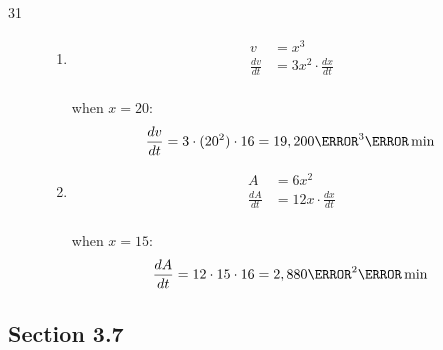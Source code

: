 \documentclass{exam}
\begin{document}
\begin{description}
\item[31]
\begin{enumerate}[a]

\item
\begin{align*}
  v &= x^3 \\ 
  \frac{dv}{dt} &= 3x^2 \cdot \frac{dx}{dt} \\  
\end{align*}

when $x = 20$:
\[
  \frac{dv}{dt} = 3 \cdot (20^2) \cdot 16 = 19,200 \cm^3 \per \min \\  
\]

\item
\begin{align*}
  A &= 6 x^2 \\ 
  \frac{dA}{dt} &= 12x \cdot \frac{dx}{dt} \\  
\end{align*}

when $x = 15$:
\[
  \frac{dA}{dt} = 12 \cdot 15 \cdot 16 = 2,880 \cm^2 \per \min \\  
\]

\end{enumerate}

\end{description}

\subsection{Section 3.7}
\end{document}
